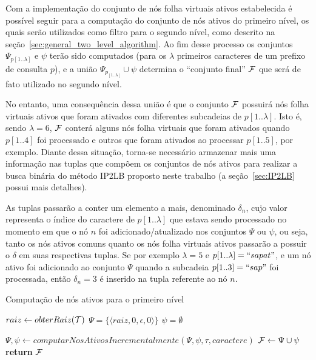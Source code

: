 Com a implementação do conjunto de nós folha virtuais ativos estabelecida é possível seguir para a computação do conjunto de nós ativos do primeiro nível, os quais serão utilizados como filtro para o segundo nível, como descrito na seção~\ref{sec:general_two_level_algorithm}. Ao fim desse processo os conjuntos $\Psi_{p[1..\lambda]}$ e $\psi$ terão sido computados (para os $\lambda$ primeiros caracteres de um prefixo de consulta $p$), e a união $\Psi_{p_[1..\lambda]} \cup \psi$ determina o ``conjunto final'' $\mathcal{F}$ que será de fato utilizado no segundo nível. 

No entanto, uma consequência dessa união é que o conjunto $\mathcal{F}$ possuirá nós folha virtuais ativos que foram ativados com diferentes subcadeias de $p[1..\lambda]$. Isto é, sendo $\lambda=6$, $\mathcal{F}$ conterá alguns nós folha virtuais que foram ativados quando $p[1..4]$ foi processado e outros que foram ativados ao processar $p[1..5]$, por exemplo. Diante dessa situação, torna-se necessário armazenar mais uma informação nas tuplas que compõem os conjuntos de nós ativos para realizar a busca binária do método IP2LB proposto neste trabalho (a seção~\ref{sec:IP2LB} possui mais detalhes). 

As tuplas passarão a conter um elemento a mais, denominado $\delta_{n}$, cujo valor representa o índice do caractere de $p[1..\lambda]$ que estava sendo processado no momento em que o nó $n$ foi adicionado/atualizado nos conjuntos $\Psi$ ou $\psi$, ou seja, tanto os nós ativos comuns quanto os nós folha virtuais ativos passarão a possuir o $\delta$ em suas respectivas tuplas. Se por exemplo $\lambda=5$ e $p[1..\lambda]=``sapat"$, e um nó ativo foi adicionado ao conjunto $\Psi$ quando a subcadeia $p[1..3]=``sap"$ foi processada, então $\delta_{n}=3$ é inserido na tupla referente ao nó $n$.

\begin{algorithm}[H]
\caption{Computação de nós ativos para o primeiro nível}\label{alg:compute_first_level_nodes}
\begin{algorithmic}[1]
    \State $raiz \leftarrow obterRaiz(\mathcal{T})$
    \State $\Psi = \{ \langle raiz, 0, \epsilon, 0 \rangle \}$
    \State $\psi = \emptyset$
    
        \State $\Psi, \psi \leftarrow computarNosAtivosIncrementalmente(\Psi, \psi, \tau, caractere)$
    \EndFor
    \State $\mathcal{F} \leftarrow \Psi \cup \psi$
    \State \textbf{return} $\mathcal{F}$
\EndFunction
\end{algorithmic}
\end{algorithm}

